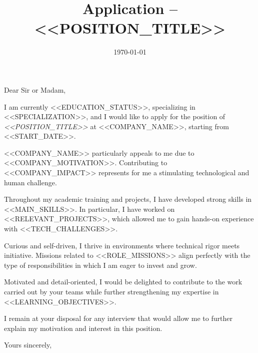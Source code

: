 \documentclass[11pt,a4paper,sans]{moderncv}
\title{Application -- <<POSITION_TITLE>>}
\begin{document}
\date{\today}
\opening{Dear Sir or Madam,}
\makelettertitle

I am currently <<EDUCATION_STATUS>>, specializing in <<SPECIALIZATION>>, and I would like to apply for the position of \textit{<<POSITION_TITLE>>} at <<COMPANY_NAME>>, starting from <<START_DATE>>.

<<COMPANY_NAME>> particularly appeals to me due to <<COMPANY_MOTIVATION>>. Contributing to <<COMPANY_IMPACT>> represents for me a stimulating technological and human challenge.

Throughout my academic training and projects, I have developed strong skills in <<MAIN_SKILLS>>. In particular, I have worked on <<RELEVANT_PROJECTS>>, which allowed me to gain hands-on experience with <<TECH_CHALLENGES>>.

Curious and self-driven, I thrive in environments where technical rigor meets initiative. Missions related to <<ROLE_MISSIONS>> align perfectly with the type of responsibilities in which I am eager to invest and grow.

Motivated and detail-oriented, I would be delighted to contribute to the work carried out by your teams while further strengthening my expertise in <<LEARNING_OBJECTIVES>>.

I remain at your disposal for any interview that would allow me to further explain my motivation and interest in this position.

\closing{Yours sincerely,}
\makeletterclosing
\end{document}
